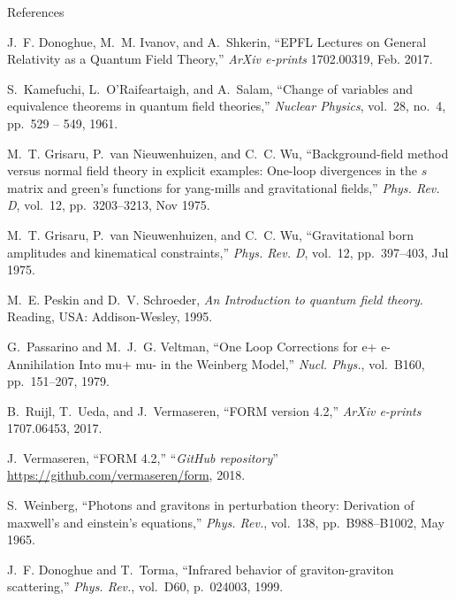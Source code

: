 \documentclass[aspectratio=169,usenames,dvipsnames]{beamer}
\begin{document}
\begin{frame}{References} \tiny
\begin{thebibliography}{1}
J.~F. {Donoghue}, M.~M. {Ivanov}, and A.~{Shkerin}, ``{EPFL Lectures on General
  Relativity as a Quantum Field Theory},'' {\em ArXiv e-prints} 1702.00319, Feb. 2017.

S.~Kamefuchi, L.~O'Raifeartaigh, and A.~Salam, ``Change of variables and
  equivalence theorems in quantum field theories,'' {\em Nuclear Physics},
  vol.~28, no.~4, pp.~529 -- 549, 1961.

M.~T. Grisaru, P.~van Nieuwenhuizen, and C.~C. Wu, ``Background-field method
  versus normal field theory in explicit examples: One-loop divergences in the
  $s$ matrix and green's functions for yang-mills and gravitational fields,''
  {\em Phys. Rev. D}, vol.~12, pp.~3203--3213, Nov 1975.

M.~T. Grisaru, P.~van Nieuwenhuizen, and C.~C. Wu, ``Gravitational born
  amplitudes and kinematical constraints,'' {\em Phys. Rev. D}, vol.~12,
  pp.~397--403, Jul 1975.

  M.~E. Peskin and D.~V. Schroeder, {\em {An Introduction to quantum field
      theory}}.
  \newblock Reading, USA: Addison-Wesley, 1995.

  G.~Passarino and M.~J.~G. Veltman, ``{One Loop Corrections for e+ e-
    Annihilation Into mu+ mu- in the Weinberg Model},'' {\em Nucl. Phys.},
  vol.~B160, pp.~151--207, 1979.

B.~Ruijl, T.~Ueda, and J.~Vermaseren, ``{FORM version 4.2},'' {\em {ArXiv
  e-prints}} 1707.06453, 2017.

  J.~Vermaseren, ``{FORM 4.2,'' ``\it{GitHub repository}}''
  \url{https://github.com/vermaseren/form}, 2018.  

  S.~Weinberg, ``Photons and gravitons in perturbation theory: Derivation of
  maxwell's and einstein's equations,'' {\em Phys. Rev.}, vol.~138,
  pp.~B988--B1002, May 1965.
  
  J.~F. Donoghue and T.~Torma, ``{Infrared behavior of graviton-graviton
    scattering},'' {\em Phys. Rev.}, vol.~D60, p.~024003, 1999.
\end{thebibliography}

\end{frame}
\end{document}
